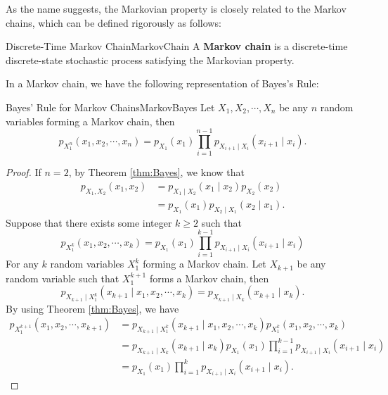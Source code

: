 \documentclass[math, code]{amznotes}
\theoremstyle{remark}
\begin{document}
As the name suggests, the Markovian property is closely related to the Markov chains, which can be defined rigorously as follows:
\begin{dfnbox}{Discrete-Time Markov Chain}{MarkovChain}
    A {\color{red} \textbf{Markov chain}} is a discrete-time discrete-state stochastic process satisfying the Markovian property.
\end{dfnbox}
In a Markov chain, we have the following representation of Bayes's Rule:
\begin{probox}{Bayes' Rule for Markov Chains}{MarkovBayes}
    Let $X_1, X_2, \cdots, X_n$ be any $n$ random variables forming a Markov chain, then 
    \begin{equation*}
        p_{X_1^n}\left(x_1, x_2, \cdots, x_n\right) = p_{X_1}\left(x_1\right)\prod_{i = 1}^{n - 1}p_{X_{i + 1} \mid X_i}\left(x_{i + 1} \mid x_i\right).
    \end{equation*}
    \tcblower
    \begin{proof}
        If $n = 2$, by Theorem \ref{thm:Bayes}, we know that 
        \begin{align*}
            p_{X_1, X_2}\left(x_1, x_2\right) & = p_{X_1 \mid X_2}\left(x_1 \mid x_2\right)p_{X_2}\left(x_2\right) \\
            & = p_{X_1}\left(x_1\right)p_{X_2 \mid X_1}\left(x_2 \mid x_1\right).
        \end{align*}
        Suppose that there exists some integer $k \geq 2$ such that 
        \begin{equation*}
            p_{X_1^k}\left(x_1, x_2, \cdots, x_k\right) = p_{X_1}\left(x_1\right)\prod_{i = 1}^{k - 1}p_{X_{i + 1} \mid X_i}\left(x_{i + 1} \mid x_i\right)
        \end{equation*}
        For any $k$ random variables $X_1^k$ forming a Markov chain. Let $X_{k + 1}$ be any random variable such that $X_1^{k + 1}$ forms a Markov chain, then 
        \begin{equation*}
            p_{X_{k + 1} \mid X_1^{k}}\left(x_{k + 1} \mid x_1, x_2, \cdots, x_k\right) = p_{X_{k + 1} \mid X_k}\left(x_{k + 1} \mid x_k\right).
        \end{equation*}
        By using Theorem \ref{thm:Bayes}, we have
        \begin{align*}
            p_{X_1^{k + 1}}\left(x_1, x_2, \cdots, x_{k + 1}\right) & = p_{X_{k + 1} \mid X_1^{k}}\left(x_{k + 1} \mid x_1, x_2, \cdots, x_k\right)p_{X_1^k}\left(x_1, x_2, \cdots, x_k\right) \\
            & = p_{X_{k + 1} \mid X_k}\left(x_{k + 1} \mid x_k\right)p_{X_1}\left(x_1\right)\prod_{i = 1}^{k - 1}p_{X_{i + 1} \mid X_i}\left(x_{i + 1} \mid x_i\right) \\
            & = p_{X_1}\left(x_1\right)\prod_{i = 1}^{k}p_{X_{i + 1} \mid X_i}\left(x_{i + 1} \mid x_i\right).
        \end{align*}
    \end{proof}
\end{probox}
\end{document}
